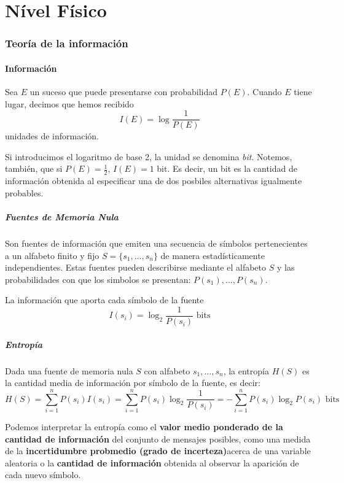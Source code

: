 \part{Nível Físico}
\section{Teoría de la información}
\subsection{Información}
Sea \(E\) un suceso que puede presentarse con probabilidad \(P(E)\). Cuando \(E\) tiene lugar, decimos que hemos recibido \[I(E)=\log\frac
{1}{P(E)}\] unidades de información.

Si introducimos el logaritmo de base 2, la unidad se denomina \textit{bit}. Notemos, también, que si \(P(E) = \frac{1}{2}\), \(I(E) = 1\) bit. Es decir, un bit es la cantidad de información obtenida al especificar una de dos posbiles alternativas igualmente probables.

\subsubsection{Fuentes de Memoria Nula}
Son fuentes de información que emiten una secuencia de símbolos pertenecientes a un alfabeto finito y fijo \(S=\{s_1,\dots,s_n\}\) de manera estadísticamente independientes. Estas fuentes pueden describirse mediante el alfabeto \(S\) y las probabilidades con que los simbolos se presentan: \(P(s_1), \dots, P(s_n)\).

La información que aporta cada símbolo de la fuente \[I(s_i) = \log_2\frac{1}{P(s_i)}\text{ bits}\]
\subsubsection{Entropía}
Dada una fuente de memoria nula \(S\) con alfabeto \({s_1,\dots,s_n}\), la entropía \(H(S)\) es la cantidad media de información por símbolo de la fuente, es decir:
\[H(S) = \sum_{i=1}^n P(s_i)I(s_i) = \sum_{i=1}^n P(s_i)\log_2\frac{1}{P(s_i)} = -\sum_{i=1}^n P(s_i)\log_2 P(s_i)\text{ bits} \]

Podemos interpretar la entropía como el \textbf{valor medio ponderado de la cantidad de información} del conjunto de mensajes posibles, como una medida de la \textbf{incertidumbre probmedio (grado de incerteza)}acerca de una variable aleatoria o la \textbf{cantidad de información} obtenida al observar la aparición de cada nuevo símbolo.

